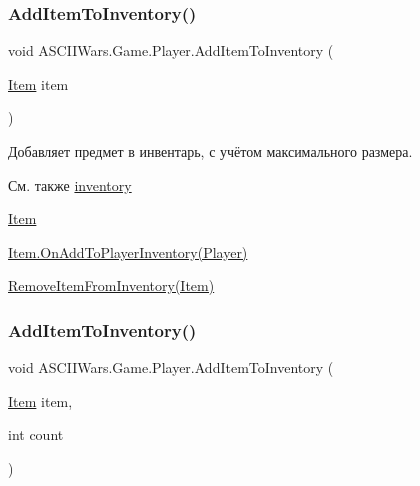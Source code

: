 \subsubsection{\texorpdfstring{Add\+Item\+To\+Inventory()}{AddItemToInventory()}\hspace{0.1cm}{\footnotesize\ttfamily [1/2]}}
{\footnotesize\ttfamily void A\+S\+C\+I\+I\+Wars.\+Game.\+Player.\+Add\+Item\+To\+Inventory (\begin{DoxyParamCaption}\item[{\hyperlink{class_a_s_c_i_i_wars_1_1_game_1_1_item}{Item}}]{item }\end{DoxyParamCaption})\hspace{0.3cm}{\ttfamily [inline]}}



Добавляет предмет в инвентарь, с учётом максимального размера. 

\begin{DoxySeeAlso}{См. также}
\hyperlink{class_a_s_c_i_i_wars_1_1_game_1_1_player_a04acfaa196162f89bfae7aee5ec45480}{inventory} 

\hyperlink{class_a_s_c_i_i_wars_1_1_game_1_1_item}{Item} 

\hyperlink{class_a_s_c_i_i_wars_1_1_game_1_1_item_aec0355b7a9f647ef24897b95563f70d1}{Item.\+On\+Add\+To\+Player\+Inventory(\+Player)} 

\hyperlink{class_a_s_c_i_i_wars_1_1_game_1_1_player_aa58a605f6337c385f4023ea842f6c246}{Remove\+Item\+From\+Inventory(\+Item)} 
\end{DoxySeeAlso}
\hypertarget{class_a_s_c_i_i_wars_1_1_game_1_1_player_a7c362d28cd4146ebdcebc754982c0ad8}{}\label{class_a_s_c_i_i_wars_1_1_game_1_1_player_a7c362d28cd4146ebdcebc754982c0ad8} 
\subsubsection{\texorpdfstring{Add\+Item\+To\+Inventory()}{AddItemToInventory()}\hspace{0.1cm}{\footnotesize\ttfamily [2/2]}}
{\footnotesize\ttfamily void A\+S\+C\+I\+I\+Wars.\+Game.\+Player.\+Add\+Item\+To\+Inventory (\begin{DoxyParamCaption}\item[{\hyperlink{class_a_s_c_i_i_wars_1_1_game_1_1_item}{Item}}]{item,  }\item[{int}]{count }\end{DoxyParamCaption})\hspace{0.3cm}{\ttfamily [inline]}}

